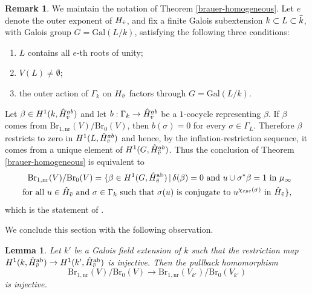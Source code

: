 \documentclass[10pt,letterpaper,twoside]{article}
\renewcommand{\1}{\mathbf{1}}
\newcommand{\nr}{\mathrm{nr}}
\newcommand{\Br}{\mathrm{Br}}
\theoremstyle{plain}
\newtheorem{lemma}[theorem]{Lemma}
\theoremstyle{plain}
\theoremstyle{definition}
\theoremstyle{named}
\theoremstyle{definition}
\newtheorem{remark}[theorem]{Remark}
\begin{document}
	\begin{remark}
		We maintain the notation of Theorem \ref{brauer-homogeneous}. Let $e$ denote the outer exponent of $H_{\Bar{v}}$, and fix a finite Galois subextension $k\subset L\subset \Bar{k}$, with Galois group $G = \text{Gal}(L/k)$, satisfying the following three conditions:
		\begin{enumerate}
			\item $L$ contains all $e$-th roots of unity;
			\item $V(L) \neq \emptyset$;
			\item the  outer action of $\Gamma_k$ on $H_{\Bar{v}}$ factors through $G = \mathrm{Gal}(L/k)$.
		\end{enumerate}
		Let $\beta\in H^1(k,\hat{H}^{ab}_{\Bar{v}})$ and let $b:\Gamma_k\to \hat{H}^{ab}_{\Bar{v}}$ be a $1$-cocycle representing $\beta$. If $\beta$ comes from $\Br_{1,\nr}(V)/\Br_0(V)$, then $b(\sigma)=0$ for every $\sigma\in \Gamma_L$. Therefore $\beta$ restricts to zero in $H^1(L,\hat{H}^{ab}_{\Bar{v}})$ and hence, by the inflation-restriction sequence, it comes from a unique element of $H^1(G,\hat{H}^{ab}_{\Bar{v}})$. Thus the conclusion of Theorem \ref{brauer-homogeneous} is equivalent to
		\begin{align*}
			\Br_{1,\nr}(V)/\Br_0(V) = \{\beta \in H^1(G, \hat{H}^{\mathrm{ab}}_{\Bar{v}}) \,|\, \delta(\beta) = 0 \text{ and } u \cup \sigma^*\beta = 1 \text{ in $\mu_\infty$}\\
			\text{for all $u \in \hat{H}_{\Bar{v}}$ and $\sigma \in \Gamma_k$ such that $\sigma(u)$ is conjugate to $u^{\chi_{cyc}(\sigma)}$ in $\hat{H}_{\Bar{v}}$}\},
		\end{align*}
		which is the statement of \cite{}.
	\end{remark}
	
	We conclude this section with the following observation.
	
	\begin{lemma}\label{injective-res}
		Let $k'$ be a Galois field extension of $k$ such that the restriction map $H^1(k,\hat{H}^{\mathrm{ab}}_{\Bar{v}})\to H^1(k',\hat{H}^{\mathrm{ab}}_{\Bar{v}})$ is injective. Then the pullback homomorphism 
		\[\Br_{1,\nr}(V)/\Br_0(V)\to \Br_{1,\nr}(V_{k'})/\Br_0(V_{k'})\]
		is injective.
	\end{lemma}
	
\end{document}

